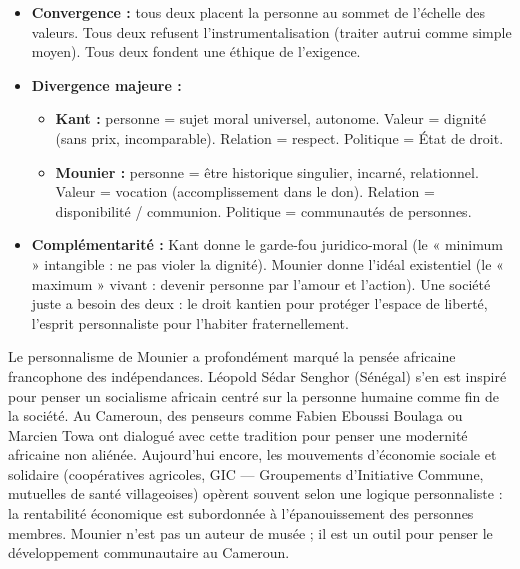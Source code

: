 \documentclass[11pt]{article}
\newcommand{\cle}[1]{{\popxbold\color{popdark}#1}}
\begin{document}
\begin{aretenir}
\begin{itemize}
    \item \textbf{Convergence :} tous deux placent la \cle{personne} au sommet de l'échelle des valeurs. Tous deux refusent l'instrumentalisation (traiter autrui comme simple moyen). Tous deux fondent une éthique de l'exigence.
    \item \textbf{Divergence majeure :}
    \begin{itemize}
        \item \textbf{Kant :} personne = \cle{sujet moral} universel, autonome. Valeur = \cle{dignité} (sans prix, incomparable). Relation = \cle{respect}. Politique = \cle{État de droit}.
        \item \textbf{Mounier :} personne = \cle{être historique} singulier, incarné, relationnel. Valeur = \cle{vocation} (accomplissement dans le don). Relation = \cle{disponibilité / communion}. Politique = \cle{communautés de personnes}.
    \end{itemize}
    \item \textbf{Complémentarité :} Kant donne le \cle{garde-fou} juridico-moral (le « minimum » intangible : ne pas violer la dignité). Mounier donne l'\cle{idéal} existentiel (le « maximum » vivant : devenir personne par l'amour et l'action). Une société juste a besoin des deux : le droit kantien pour protéger l'espace de liberté, l'esprit personnaliste pour l'habiter fraternellement.
\end{itemize}
\end{aretenir}

\begin{savaistu}
Le personnalisme de Mounier a profondément marqué la pensée africaine francophone des indépendances. \cle{Léopold Sédar Senghor} (Sénégal) s'en est inspiré pour penser un socialisme africain centré sur la personne humaine comme fin de la société. Au Cameroun, des penseurs comme \cle{Fabien Eboussi Boulaga} ou \cle{Marcien Towa} ont dialogué avec cette tradition pour penser une modernité africaine non aliénée. Aujourd'hui encore, les \cle{mouvements d'économie sociale et solidaire} (coopératives agricoles, GIC — Groupements d'Initiative Commune, mutuelles de santé villageoises) opèrent souvent selon une logique personnaliste : la rentabilité économique est subordonnée à l'épanouissement des personnes membres. Mounier n'est pas un auteur de musée ; il est un outil pour penser le \cle{développement communautaire} au Cameroun.
\end{savaistu}
\end{document}
